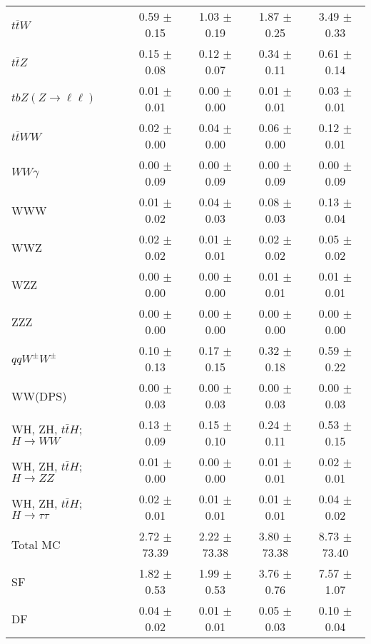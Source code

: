 \begin{tabular}{l|cccc}
                   $t\overline{t}W$ &  0.59 $\pm$  0.15 &  1.03 $\pm$  0.19 &  1.87 $\pm$  0.25 &  3.49 $\pm$  0.33 \\
                   $t\overline{t}Z$ &  0.15 $\pm$  0.08 &  0.12 $\pm$  0.07 &  0.34 $\pm$  0.11 &  0.61 $\pm$  0.14 \\
    $tbZ (Z \rightarrow \ell \ell)$ &  0.01 $\pm$  0.01 &  0.00 $\pm$  0.00 &  0.01 $\pm$  0.01 &  0.03 $\pm$  0.01 \\
                  $t\overline{t}WW$ &  0.02 $\pm$  0.00 &  0.04 $\pm$  0.00 &  0.06 $\pm$  0.00 &  0.12 $\pm$  0.01 \\
                         $WW\gamma$ &  0.00 $\pm$  0.09 &  0.00 $\pm$  0.09 &  0.00 $\pm$  0.09 &  0.00 $\pm$  0.09 \\
                                WWW &  0.01 $\pm$  0.02 &  0.04 $\pm$  0.03 &  0.08 $\pm$  0.03 &  0.13 $\pm$  0.04 \\
                                WWZ &  0.02 $\pm$  0.02 &  0.01 $\pm$  0.01 &  0.02 $\pm$  0.02 &  0.05 $\pm$  0.02 \\
                                WZZ &  0.00 $\pm$  0.00 &  0.00 $\pm$  0.00 &  0.01 $\pm$  0.01 &  0.01 $\pm$  0.01 \\
                                ZZZ &  0.00 $\pm$  0.00 &  0.00 $\pm$  0.00 &  0.00 $\pm$  0.00 &  0.00 $\pm$  0.00 \\
                 $qqW^{\pm}W^{\pm}$ &  0.10 $\pm$  0.13 &  0.17 $\pm$  0.15 &  0.32 $\pm$  0.18 &  0.59 $\pm$  0.22 \\
                            WW(DPS) &  0.00 $\pm$  0.03 &  0.00 $\pm$  0.03 &  0.00 $\pm$  0.03 &  0.00 $\pm$  0.03 \\
WH, ZH, $t\bar{t}H$; $H \rightarrow WW$ &  0.13 $\pm$  0.09 &  0.15 $\pm$  0.10 &  0.24 $\pm$  0.11 &  0.53 $\pm$  0.15 \\
WH, ZH, $t\bar{t}H$; $H \rightarrow ZZ$ &  0.01 $\pm$  0.00 &  0.00 $\pm$  0.00 &  0.01 $\pm$  0.01 &  0.02 $\pm$  0.01 \\
WH, ZH, $t\bar{t}H$; $H \rightarrow \tau\tau$ &  0.02 $\pm$  0.01 &  0.01 $\pm$  0.01 &  0.01 $\pm$  0.01 &  0.04 $\pm$  0.02 \\
\hline\hline
                           Total MC &  2.72 $\pm$ 73.39 &  2.22 $\pm$ 73.38 &  3.80 $\pm$ 73.38 &  8.73 $\pm$ 73.40 \\
\hline
                                 SF &  1.82 $\pm$  0.53 &  1.99 $\pm$  0.53 &  3.76 $\pm$  0.76 &  7.57 $\pm$  1.07 \\
                                 DF &  0.04 $\pm$  0.02 &  0.01 $\pm$  0.01 &  0.05 $\pm$  0.03 &  0.10 $\pm$  0.04 \\

\end{tabular}
